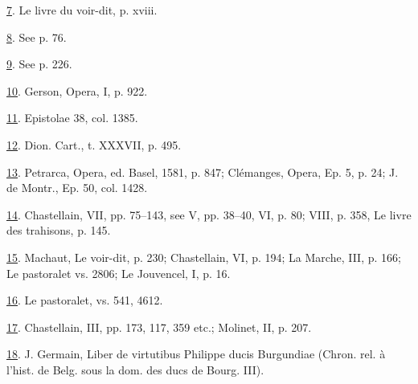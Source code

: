\protect\hypertarget{23_NOTES.xhtmlux5cux23id_111}{\protect\hyperlink{22_Chapter_Fourteen__THE_COMING_OF.xhtmlux5cux23id_110}{7}}.
Le livre du voir-dit, p. xviii.

\protect\hypertarget{23_NOTES.xhtmlux5cux23id_109}{\protect\hyperlink{22_Chapter_Fourteen__THE_COMING_OF.xhtmlux5cux23id_108}{8}}.
See p. 76.

\protect\hypertarget{23_NOTES.xhtmlux5cux23id_107}{\protect\hyperlink{22_Chapter_Fourteen__THE_COMING_OF.xhtmlux5cux23id_106}{9}}.
See p. 226.

\protect\hypertarget{23_NOTES.xhtmlux5cux23id_105}{\protect\hyperlink{22_Chapter_Fourteen__THE_COMING_OF.xhtmlux5cux23id_104}{10}}.
Gerson, Opera, I, p. 922.

\protect\hypertarget{23_NOTES.xhtmlux5cux23id_103}{\protect\hyperlink{22_Chapter_Fourteen__THE_COMING_OF.xhtmlux5cux23id_102}{11}}.
Epistolae 38, col. 1385.

\protect\hypertarget{23_NOTES.xhtmlux5cux23id_101}{\protect\hyperlink{22_Chapter_Fourteen__THE_COMING_OF.xhtmlux5cux23id_100}{12}}.
Dion. Cart., t. XXXVII, p. 495.

\protect\hypertarget{23_NOTES.xhtmlux5cux23id_99}{\protect\hyperlink{22_Chapter_Fourteen__THE_COMING_OF.xhtmlux5cux23id_98}{13}}.
Petrarca, Opera, ed. Basel, 1581, p. 847; Clémanges, Opera, Ep. 5, p.
24; J. de Montr., Ep. 50, col. 1428.

\protect\hypertarget{23_NOTES.xhtmlux5cux23id_97}{\protect\hyperlink{22_Chapter_Fourteen__THE_COMING_OF.xhtmlux5cux23id_96}{14}}.
Chastellain, VII, pp. 75--143, see V, pp. 38--40, VI, p. 80; VIII, p.
358, Le livre des trahisons, p. 145.

\protect\hypertarget{23_NOTES.xhtmlux5cux23id_95}{\protect\hyperlink{22_Chapter_Fourteen__THE_COMING_OF.xhtmlux5cux23id_94}{15}}.
Machaut, Le voir-dit, p. 230; Chastellain, VI, p. 194; La Marche, III,
p. 166; Le pastoralet vs. 2806; Le Jouvencel, I, p. 16.

\protect\hypertarget{23_NOTES.xhtmlux5cux23id_93}{\protect\hyperlink{22_Chapter_Fourteen__THE_COMING_OF.xhtmlux5cux23id_92}{16}}.
Le pastoralet, vs. 541, 4612.

\protect\hypertarget{23_NOTES.xhtmlux5cux23id_91}{\protect\hyperlink{22_Chapter_Fourteen__THE_COMING_OF.xhtmlux5cux23id_90}{17}}.
Chastellain, III, pp. 173, 117, 359 etc.; Molinet, II, p. 207.

\protect\hypertarget{23_NOTES.xhtmlux5cux23id_89}{\protect\hyperlink{22_Chapter_Fourteen__THE_COMING_OF.xhtmlux5cux23id_88}{18}}.
J. Germain, Liber de virtutibus Philippe ducis Burgundiae (Chron. rel. à
l'hist. de Belg. sous la dom. des ducs de Bourg. III).

